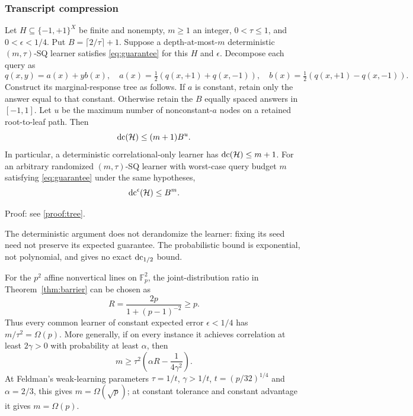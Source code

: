 \subsubsection{Transcript compression}

\begin{theorem}\label{thm:tree}
Let $H\subseteq\{-1,+1\}^X$ be finite and nonempty, $m\ge1$ an integer, $0<\tau\le1$, and $0<\epsilon<1/4$. Put $B=\lceil2/\tau\rceil+1$. Suppose a depth-at-most-$m$ deterministic $(m,\tau)$-SQ learner satisfies \eqref{eq:guarantee} for this $H$ and $\epsilon$. Decompose each query as
\[
 q(x,y)=a(x)+yb(x),\quad
 a(x)=\tfrac12(q(x,+1)+q(x,-1)),\quad
 b(x)=\tfrac12(q(x,+1)-q(x,-1)).
\]
Construct its marginal-response tree as follows. If $a$ is constant, retain only the answer equal to that constant. Otherwise retain the $B$ equally spaced answers in $[-1,1]$. Let $u$ be the maximum number of nonconstant-$a$ nodes on a retained root-to-leaf path. Then
\begin{equation}\label{eq:tree}
 \operatorname{dc}(\mathcal H)\leq(m+1)B^u.
\end{equation}
In particular, a deterministic correlational-only learner has $\operatorname{dc}(\mathcal H)\leq m+1$.
For an arbitrary randomized $(m,\tau)$-SQ learner with worst-case query budget $m$ satisfying \eqref{eq:guarantee} under the same hypotheses,
\begin{equation}\label{eq:approx}
 \operatorname{dc}^{\epsilon}(\mathcal H)\leq B^m.
\end{equation}
\end{theorem}

\noindent Proof: see \cref{proof:tree}.\par


The deterministic argument does not derandomize the learner: fixing its seed need not preserve its expected guarantee. The probabilistic bound is exponential, not polynomial, and gives no exact $\operatorname{dc}_{1/2}$ bound.



\begin{proposition}\label{prop:affine}
For the $p^2$ affine nonvertical lines on $\mathbb F_p^2$, the joint-distribution ratio in Theorem~\ref{thm:barrier} can be chosen as
\[
 R=\frac{2p}{1+(p-1)^{-2}}\ge p.
\]
Thus every common learner of constant expected error $\epsilon<1/4$ has $m/\tau^2=\Omega(p)$. More generally, if on every instance it achieves correlation at least $2\gamma>0$ with probability at least $\alpha$, then
\[
 m\ge\tau^2\left(\alpha R-\frac1{4\gamma^2}\right).
\]
At Feldman's weak-learning parameters $\tau=1/t$, $\gamma>1/t$, $t=(p/32)^{1/4}$ and $\alpha=2/3$, this gives $m=\Omega(\sqrt p)$; at constant tolerance and constant advantage it gives $m=\Omega(p)$.
\end{proposition}

